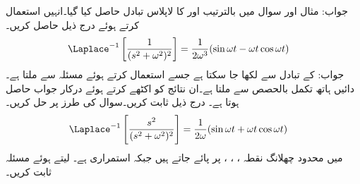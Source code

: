 جواب:
مثال  اور سوال  میں بالترتیب  اور  کا لاپلاس تبادل حاصل کیا گیا۔انہیں استعمال کرتے ہوئے درج ذیل حاصل کریں۔
\begin{align}
\Laplace^{-1}\left[\frac{1}{(s^2+\omega^2)^2}\right]&=\frac{1}{2\omega^3}(\sin \omega t-\omega t \cos \omega t)
\end{align}
جواب: کے تبادل سے  لکھا جا سکتا ہے جسے استعمال کرتے ہوئے مسئلہ  سے  ملتا ہے۔دائیں ہاتھ تکمل بالحصص سے  ملتا ہے۔ان نتائج کو اکٹھے کرتے ہوئے درکار جواب حاصل ہوتا ہے۔
درج ذیل ثابت کریں۔سوال  کی طرز پر حل کریں۔
\begin{align}
\Laplace^{-1}\left[\frac{s^2}{(s^2+\omega^2)^2}\right]&=\frac{1}{2\omega}(\sin \omega t+\omega t\cos \omega t)
\end{align}
 میں محدود چھلانگ نقطہ ، ، ،  پر پائے جاتے ہیں جبکہ  استمراری ہے۔    لیتے ہوئے  مسئلہ  ثابت کریں۔  

